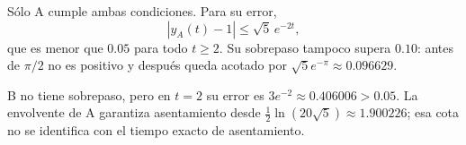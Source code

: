 Sólo A cumple ambas condiciones. Para su error,
\[
|y_A(t)-1|\le\sqrt5\,e^{-2t},
\]
que es menor que \(0.05\) para todo \(t\ge2\). Su sobrepaso tampoco supera \(0.10\): antes de \(\pi/2\) no es positivo y después queda acotado por \(\sqrt5e^{-\pi}\approx0.096629\).

B no tiene sobrepaso, pero en \(t=2\) su error es \(3e^{-2}\approx0.406006>0.05\). La envolvente de A garantiza asentamiento desde \(\tfrac12\ln(20\sqrt5)\approx1.900226\); esa cota no se identifica con el tiempo exacto de asentamiento.
